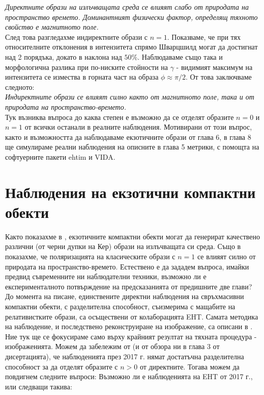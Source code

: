 \documentclass[12pt]{article}
\numberwithin{equation}{section}
\numberwithin{figure}{section}
\begin{document}
	\emph{Директните образи на излъчващата среда се влияят слабо от природата на пространство времето. Доминантният физически фактор, определящ тяхното свойство е магнитното поле.}\\
	
	След това разгледахме индиректните образи с $n = 1$. Показваме, че при тях относителните отклонения в интензитета спрямо Шварцшилд могат да достигнат над 2 порядъка, докато в наклона над $50\%$. Наблюдаваме също така и морфологична разлика при по-ниските стойности на $\gamma$ - видимият максимум на интензитета се измества в горната част на образа $\phi\approx\pi / 2$. От това заключваме следното:\\
	
	\emph{Индиректните образи се влияят силно както от магнитното поле, така и от природата на пространство-времето.}\\

	Тук възниква въпроса до каква степен е възможно да се отделят образите $n = 0$ и $n = 1$ от всички останали в реалните наблюдения. Мотивирани от този въпрос, както и възможността да наблюдаваме екзотичните образи от глава 6, в глава 8 ще симулираме реални наблюдения на описните в глава 5 метрики, с помощта на софтуерните пакети ehtim и VIDA.
	
	\section{Наблюдения на екзотични компактни обекти}
	
	Както показахме в \cite{Deliyski2022}, екзотичните компактни обекти могат да генерират качествено различни (от черни дупки на Кер) образи на излъчващата си среда. Също в \cite{Delijski2022}\cite{Deliyski2023} показахме, че поляризацията на класическите образи с $n = 1$ се влияят силно от природата на пространство-времето. Естествено е да зададем въпроса, имайки предвид съвременните ни наблюдателни техники, възможно ли е експерименталното потвърждение на предсказанията от предишните две глави?\\
	
	До момента на писане, единствените директни наблюдения на свръхмасивни компактни обекти, с разделителна способност, съизмерима с мащабите на релативистките образи, са осъществени от колаборацията EHT. Самата методика на наблюдение, и последствено реконструиране на изображение, са описани в \cite{EHT_M87_II}\cite{EHT_M87_III}. Ние тук ще се фокусираме само върху крайният резултат на тяхната процедура - изображенията. Можем да забележим от \cite{EHT_M87_I}\cite{EHT_SGR_I} (и от обзора ни в глава 3 от дисертацията), че наблюденията през 2017 г. нямат достатъчна разделителна способност за да отделят образите с $n > 0 $ от директните. Тогава можем да повдигнем следните въпроси: Възможно ли е наблюденията на EHT от 2017 г., или следващи такива:\\
	
\end{document}
